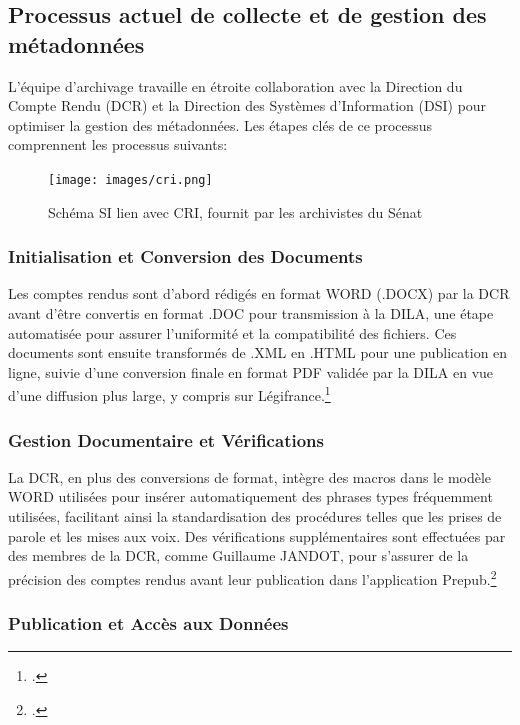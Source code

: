 \subsection{Processus actuel de collecte et de gestion des métadonnées}

L'équipe d'archivage travaille en étroite collaboration avec la Direction du Compte Rendu (DCR) et la Direction des Systèmes d'Information (DSI) pour optimiser la gestion des métadonnées. Les étapes clés de ce processus comprennent les processus suivants:

\begin{figure}[H]
    \centering
    \texttt{[image: images/cri.png]}
    \caption{Schéma SI lien avec CRI, fournit par les archivistes du Sénat}
\end{figure}


\subsubsection{Initialisation et Conversion des Documents}

Les comptes rendus sont d'abord rédigés en format WORD (.DOCX) par la DCR avant d'être convertis en format .DOC pour transmission à la \gls{DILA}, une étape automatisée pour assurer l'uniformité et la compatibilité des fichiers. Ces documents sont ensuite transformés de .\gls{XML} en .\gls{HTML} pour une publication en ligne, suivie d'une conversion finale en format \gls{PDF} validée par la \gls{DILA} en vue d’une diffusion plus large, y compris sur Légifrance.\footcite{VadeMecum}

\subsubsection{Gestion Documentaire et Vérifications}

La DCR, en plus des conversions de format, intègre des macros dans le modèle WORD utilisées pour insérer automatiquement des phrases types fréquemment utilisées, facilitant ainsi la standardisation des procédures telles que les prises de parole et les mises aux voix. Des vérifications supplémentaires sont effectuées par des membres de la DCR, comme Guillaume JANDOT, pour s'assurer de la précision des comptes rendus avant leur publication dans l’application Prepub.\footcite{VadeMecum}

\subsubsection{Publication et Accès aux Données}

